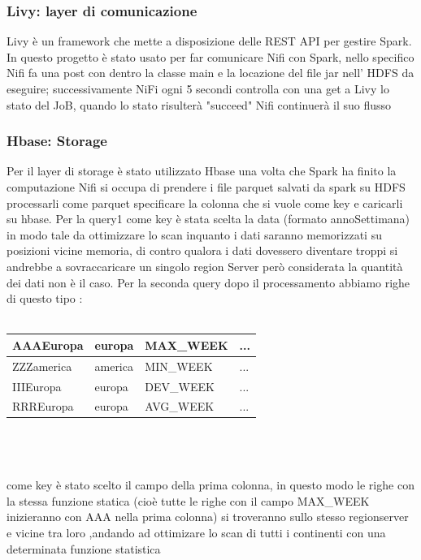 \documentclass[acmsmall]{acmart}
\begin{document}
\subsubsection{Livy: layer di comunicazione}
Livy è un framework che mette a disposizione delle REST API per gestire Spark. In questo progetto è stato usato per far comunicare Nifi con Spark, nello specifico Nifi fa una post con dentro la classe main e la locazione del file jar nell' HDFS  da eseguire;
successivamente NiFi ogni 5 secondi controlla con una get a Livy lo stato del JoB, quando lo stato risulterà "succeed" Nifi continuerà il suo flusso 

\subsubsection{Hbase: Storage}
Per il layer di storage è stato utilizzato Hbase una volta che Spark ha finito la computazione Nifi si occupa di prendere i file parquet salvati 
da spark su HDFS processarli come parquet specificare la colonna che si vuole come key e caricarli su hbase.
Per la query1 come key è stata scelta la data (formato annoSettimana) in modo tale da ottimizzare lo scan inquanto i dati saranno memorizzati su posizioni vicine memoria, di contro qualora i dati dovessero diventare troppi si andrebbe a sovraccaricare un singolo region Server però considerata la quantità dei dati non è il caso.  Per la seconda query dopo il processamento abbiamo righe di questo tipo :
\\
\\
\hspace{40mm}\begin{tabular}{|l|l|l|l|}
\hline
AAAEuropa  & europa  & MAX\_WEEK & ... \\ \hline
ZZZamerica & america & MIN\_WEEK & ... \\ \hline
IIIEuropa  & europa  & DEV\_WEEK & ... \\ \hline
RRREuropa  & europa  & AVG\_WEEK & ... \\ \hline
\end{tabular}
\\
\\
\\
 come key è stato scelto il campo della prima colonna, in questo modo le righe con la stessa funzione statica (cioè tutte le righe con il campo MAX\_WEEK inizieranno con AAA nella prima colonna) si troveranno sullo stesso regionserver e vicine tra loro ,andando ad ottimizare lo scan di tutti i continenti con una determinata funzione statistica 
\end{document}
